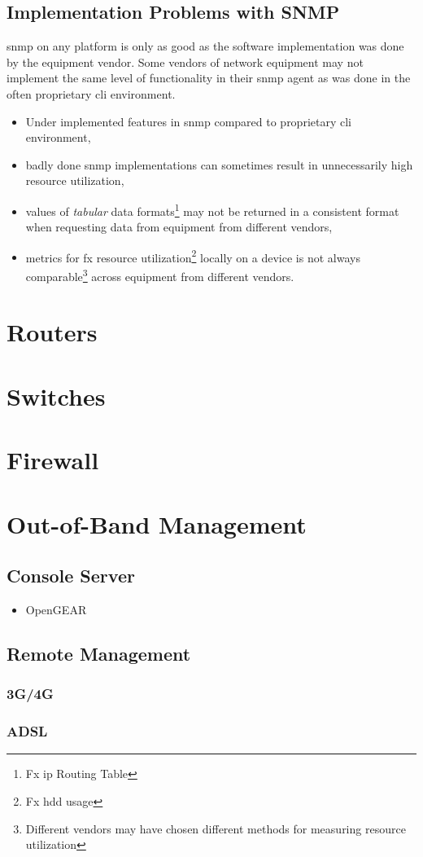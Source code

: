 \subsection{Implementation Problems with SNMP}

\gls{snmp} on any platform is only as good as the software implementation was done by the equipment vendor. Some vendors of network equipment may not implement the same level of functionality in their \gls{snmp} agent as was done in the often proprietary \gls{cli} environment.\cite{wiki:Simple_Network_Management_Protocol}

\begin{itemize}
	\item Under implemented  features in \gls{snmp} compared to proprietary \gls{cli} environment,
	\item badly done \gls{snmp} implementations can sometimes result in unnecessarily high resource utilization,
	\item values of \textit{tabular} data formats\footnote{Fx \gls{ip} Routing Table} may not be returned in a consistent format when requesting data from equipment from different vendors,
	\item metrics for fx resource utilization\footnote{Fx hdd usage} locally on a device is not always comparable\footnote{Different vendors may have chosen different methods for measuring resource utilization} across equipment from different vendors.
\end{itemize}

\section{Routers}

\section{Switches}

\section{Firewall}

\section[OOB Mgmt]{Out-of-Band Management}

\subsection{Console Server}

\begin{itemize}
	\item OpenGEAR
\end{itemize}

\subsection[Remote Mgmt]{Remote Management}

\subsubsection{3G/4G}

\subsubsection{ADSL}
